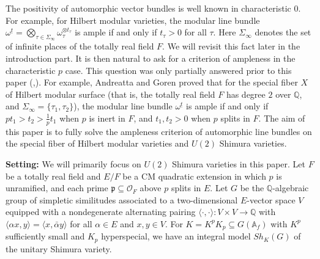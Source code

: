 \documentclass{article}
\begin{document}
The positivity of automorphic vector bundles is well known in characteristic $0$. For example, for Hilbert modular varieties, the modular line bundle $\omega^{\underline{t}}=\bigotimes\limits_{\tau\in\Sigma_{\infty}}\omega_\tau^{\otimes t_\tau}$ is ample if and only if $t_\tau>0$ for all $\tau$. Here $\Sigma_{\infty}$ denotes the set of infinite places of the totally real field $F$. We will revisit this fact later in the introduction part. It is then natural to ask for a criterion of ampleness in the characteristic $p$ case. This question was only partially answered prior to this paper (\citep{Tian-Xiao},\citep{Andreatta-Goren}). For example, Andreatta and Goren \citep{Andreatta-Goren} proved that for the special fiber $X$ of Hilbert modular surface (that is, the totally real field $F$ has degree $2$ over $\mathbb{Q}$, and $\Sigma_{\infty}=\{\tau_1,\tau_2\}$), the modular line bundle $\omega^{\underline{t}}$ is ample if and only if $pt_1>t_2>\frac{1}{p}t_1$ when $p$ is inert in $F$, and $t_1,t_2>0$ when $p$ splits in $F$. The aim of this paper is to fully solve the ampleness criterion of automorphic line bundles on the special fiber of Hilbert modular varieties and $U(2)$ Shimura varieties.


\medskip
\noindent\textbf{Setting:} We will primarily focus on $U(2)$ Shimura varieties in this paper. Let $F$ be a totally real field and $E/F$ be a CM quadratic extension in which $p$ is unramified, and each prime $\mathfrak{p}\subseteq \mathcal{O}_F$ above $p$ splits in $E$. Let $G$ be the $\mathbb{Q}$-algebraic group of simpletic similitudes associated to a two-dimensional $E$-vector space $V$ equipped with a nondegenerate alternating pairing $\langle\cdot,\cdot\rangle:V\times V\to \mathbb{Q}$ with $\langle\alpha x,y\rangle=\langle x,\bar\alpha y\rangle$ for all $\alpha\in E$ and $x,y\in V$. For $K=K^pK_p\subseteq G(\mathbb{A}_f)$ with $K^p$ sufficiently small and $K_p$ hyperspecial, we have an integral model $Sh_K(G)$ of the unitary Shimura variety. 
\end{document}
